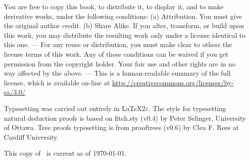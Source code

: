 {\footnotesize
You are free to copy this book, to distribute it, to display it, and to make derivative works, under the following conditions: (a) Attribution. You must give the original author credit. (b) Share Alike. If you alter, transform, or build upon this work, you may distribute the resulting work only under a license identical to this one. --- For any reuse or distribution, you must make clear to others the license terms of this work. Any of these conditions can be waived if you get permission from the copyright holder. Your fair use and other rights are in no way affected by the above. --- This is a human-readable summary of the full license, which is available on-line at \url{http://creativecommons.org/licenses/by-sa/3.0/}
}

{
Typesetting was carried out entirely in \LaTeX$2\varepsilon$. The style for typesetting natural deduction proofs is based on fitch.sty (v0.4) by Peter Selinger, University of Ottawa. Tree proofs typesetting is from prooftrees (v0.6) by Clea F. Rees at Cardiff University.

This copy of \forallx\ is current as of \today.
}